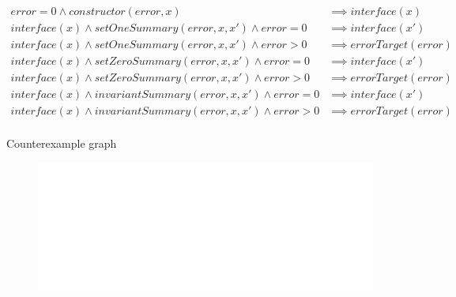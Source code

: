 \documentclass[aspectratio=169,10pt]{beamer}
\begin{document}
\begin{frame}[fragile]
{\small
\begin{align*}
error = 0 \land	constructor(error, x) & \implies interface(x) \\
interface(x) \land setOneSummary(error, x, x') \land error = 0 & \implies interface(x') \\
interface(x) \land setOneSummary(error, x, x') \land error > 0 & \implies errorTarget(error) \\
interface(x) \land setZeroSummary(error, x, x') \land error = 0 & \implies interface(x') \\
interface(x) \land setZeroSummary(error, x, x') \land error > 0 & \implies errorTarget(error) \\
interface(x) \land invariantSummary(error, x, x') \land error = 0 & \implies interface(x') \\
interface(x) \land invariantSummary(error, x, x') \land error > 0 & \implies errorTarget(error) \\
\end{align*}
}%
\end{frame}

\begin{frame}[fragile]
\begin{center}
Counterexample graph
\begin{figure}
	\includegraphics[scale=0.4]{images/binary_machine_cex_graph}
\end{figure}
\end{center}
\end{frame}
\end{document}
